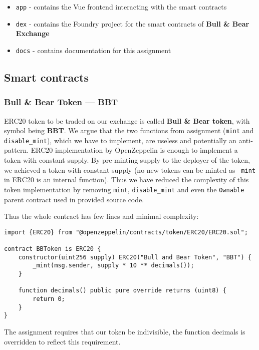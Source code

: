 \documentclass[11pt,a4paper]{article}
\begin{document}
\begin{itemize}
    \item \texttt{app} - contains the Vue frontend interacting with the smart contracts
    \item \texttt{dex} - contains the Foundry project for the smart contracts of \textbf{Bull \& Bear Exchange}
    \item \texttt{docs} - contains documentation for this assignment
\end{itemize}

\subsection*{Smart contracts}

\subsubsection*{Bull \& Bear Token --- BBT}

ERC20 token to be traded on our exchange is called \textbf{Bull \& Bear token},
with symbol being \textbf{BBT}. We argue that the two functions from assignment
(\texttt{mint} and \texttt{disable\_mint}), which we have to implement, are
useless and potentially an anti-pattern. ERC20 implementation by
OpenZeppelin is enough to implement a token with constant supply.
By pre-minting supply to the deployer of the token, we achieved a token
with constant supply (no new tokens can be minted as \texttt{\_mint} in ERC20
is an internal function\cite{openzeppelinERC20}). Thus we have reduced the
complexity of this token implementation by removing \texttt{mint}, \texttt{disable\_mint}
and even the \texttt{Ownable} parent contract used in provided source code.

Thus the whole contract has few lines and minimal complexity:

\begin{verbatim}
import {ERC20} from "@openzeppelin/contracts/token/ERC20/ERC20.sol";

contract BBToken is ERC20 {
    constructor(uint256 supply) ERC20("Bull and Bear Token", "BBT") {
        _mint(msg.sender, supply * 10 ** decimals());
    }

    function decimals() public pure override returns (uint8) {
        return 0;
    }
}
\end{verbatim}

The assignment requires that our token be indivisible, the function
decimals is overridden to reflect this requirement.
\end{document}
